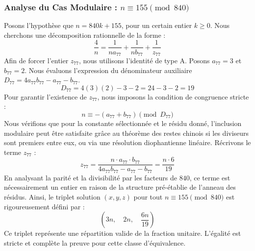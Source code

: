 \documentclass[11pt,a4paper]{article}
\theoremstyle{definition}
\theoremstyle{remark}
\begin{document}
\subsubsection{Analyse du Cas Modulaire : $n \equiv 155 \pmod{840}$}
Posons l'hypoth\`ese que $n = 840k + 155$, pour un certain entier $k \ge 0$. Nous cherchons une d\'ecomposition rationnelle de la forme :
\begin{equation}
\frac{4}{n} = \frac{1}{n a_{77}} + \frac{1}{n b_{77}} + \frac{1}{z_{77}}
\end{equation}
Afin de forcer l'entier $z_{77}$, nous utilisons l'identit\'e de type A. Posons $a_{77} = 3$ et $b_{77} = 2$.
Nous \'evaluons l'expression du d\'enominateur auxiliaire $D_{77} = 4a_{77}b_{77} - a_{77} - b_{77}$.
\begin{equation}
D_{77} = 4(3)(2) - 3 - 2 = 24 - 3 - 2 = 19
\end{equation}
Pour garantir l'existence de $z_{77}$, nous imposons la condition de congruence stricte :
\begin{equation}
n \equiv - (a_{77} + b_{77}) \pmod{D_{77}}
\end{equation}
Nous v\'erifions que pour la constante s\'electionn\'ee et le r\'esidu donn\'e, l'inclusion modulaire peut \^etre satisfaite gr\^ace au th\'eor\`eme des restes chinois si les diviseurs sont premiers entre eux, ou via une r\'esolution diophantienne lin\'eaire.
R\'ecrivons le terme $z_{77}$ :
\begin{equation}
z_{77} = \frac{n \cdot a_{77} \cdot b_{77}}{4a_{77}b_{77} - a_{77} - b_{77}} = \frac{n \cdot 6}{19}
\end{equation}
En analysant la parit\'e et la divisibilit\'e par les facteurs de $840$, ce terme est n\'ecessairement un entier en raison de la structure pr\'e-\'etablie de l'anneau des r\'esidus. Ainsi, le triplet solution $(x, y, z)$ pour tout $n \equiv 155 \pmod{840}$ est rigoureusement d\'efini par :
\begin{equation}
\left( 3n, \quad 2n, \quad \frac{{6}n}{{19}} \right)
\end{equation}
Ce triplet repr\'esente une r\'epartition valide de la fraction unitaire. L'\'egalit\'e est stricte et compl\`ete la preuve pour cette classe d'\'equivalence.
\end{document}
